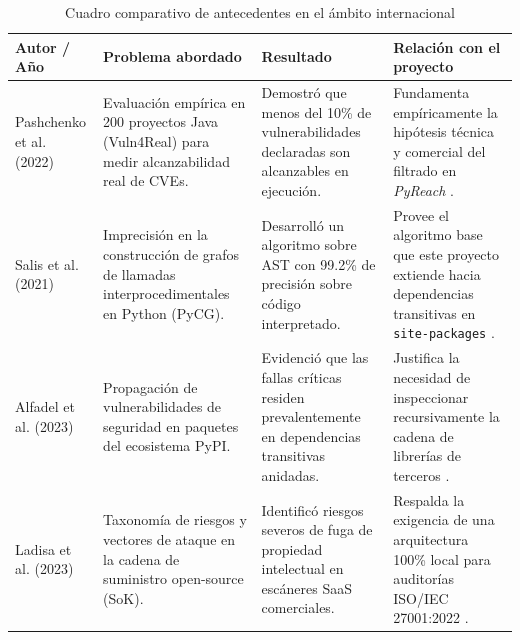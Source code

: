 \begin{table}[H]
\centering
\caption{Cuadro comparativo de antecedentes en el ámbito internacional}
\label{tab:antecedentes}
\small
{}
\begin{tabularx}{\textwidth}{>{\raggedright\arraybackslash}p{3.2cm} >{\raggedright\arraybackslash}p{3.8cm} >{\raggedright\arraybackslash}p{3.6cm} X}
\toprule
\textbf{Autor / Año} & \textbf{Problema abordado} & \textbf{Resultado} & \textbf{Relación con el proyecto} \\
\midrule
Pashchenko et al. (2022) & 
Evaluación empírica en 200 proyectos Java (Vuln4Real) para medir alcanzabilidad real de CVEs. & 
Demostró que menos del 10\% de vulnerabilidades declaradas son alcanzables en ejecución. & 
Fundamenta empíricamente la hipótesis técnica y comercial del filtrado en \textit{PyReach} \parencite{pashchenko2022vuln4real}. \\ %
\addlinespace
Salis et al. (2021) & 
Imprecisión en la construcción de grafos de llamadas interprocedimentales en Python (PyCG). & 
Desarrolló un algoritmo sobre AST con 99.2\% de precisión sobre código interpretado. & 
Provee el algoritmo base que este proyecto extiende hacia dependencias transitivas en \texttt{site-packages} \parencite{salis2021pycg}. \\ %
\addlinespace
Alfadel et al. (2023) & 
Propagación de vulnerabilidades de seguridad en paquetes del ecosistema PyPI. & 
Evidenció que las fallas críticas residen prevalentemente en dependencias transitivas anidadas. & 
Justifica la necesidad de inspeccionar recursivamente la cadena de librerías de terceros \parencite{alfadel2023empirical}. \\ %
\addlinespace
Ladisa et al. (2023) & 
Taxonomía de riesgos y vectores de ataque en la cadena de suministro open-source (SoK). & 
Identificó riesgos severos de fuga de propiedad intelectual en escáneres SaaS comerciales. & 
Respalda la exigencia de una arquitectura 100\% local para auditorías ISO/IEC 27001:2022 \parencite{ladisa2023sok}. \\ %
\bottomrule
\end{tabularx}
\end{table}

